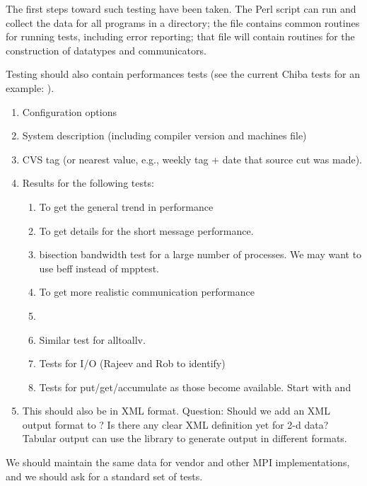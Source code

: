 \documentclass{article}
\begin{document}
The first steps toward such testing have been taken.  The Perl script
 can run and collect the data for all programs in a
directory; the file  contains common routines for
running tests, including error reporting; that file will contain routines for
the construction of datatypes and communicators. 

Testing should also contain performances tests (see the current Chiba
tests for an example: ).
\begin{enumerate}
\item Configuration options
\item System description (including compiler version and machines file)
\item CVS tag (or nearest value, e.g., weekly tag + date that source
cut was made).
\item Results for the following tests:
    \begin{enumerate}
    \item {} To get the general trend in performance
    \item {} To get details for the short message
performance. 
    \item bisection bandwidth test for a large number of processes.
    We may want to use beff instead of mpptest.
    \item {} To get more
    realistic communication performance
    \item {} 
    \item Similar test for alltoallv. 
    \item Tests for I/O (Rajeev and Rob to identify)
    \item Tests for put/get/accumulate as those become available.
    Start with  and 
    \end{enumerate}
\item This should also be in XML format.
    Question: Should we add an XML output format to ?
Is there any clear XML definition yet for 2-d data?
Tabular output can use the  library to generate output in
different formats.


\end{enumerate}
We should maintain the same data for vendor and other MPI
implementations, and we should ask for a standard set of tests.  
\end{document}
